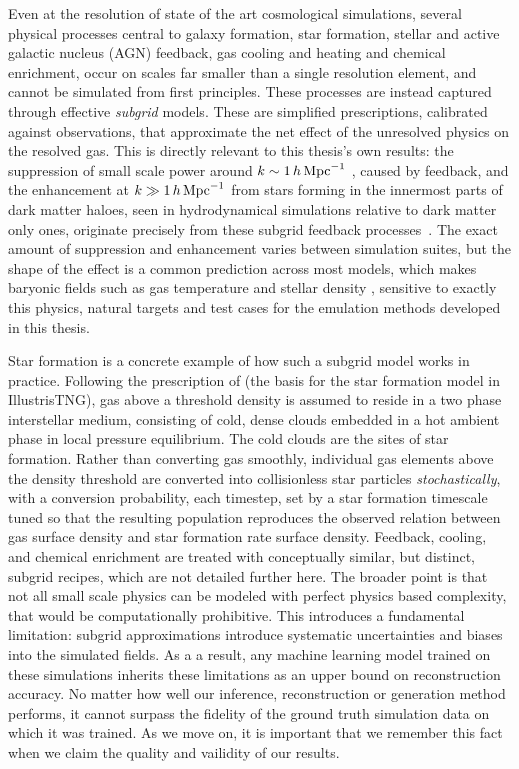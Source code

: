 \vspace{\baselineskip}

Even at the resolution of state of the art cosmological simulations, several physical processes central to galaxy formation, star formation, stellar and active galactic nucleus (AGN) feedback, gas cooling and heating and chemical enrichment, occur on scales far smaller than a single resolution element, and cannot be simulated from first principles. These processes are instead captured through effective \emph{subgrid} models. These are simplified prescriptions, calibrated against observations, that approximate the net effect of the unresolved physics on the resolved gas. This is directly relevant to this thesis's own results: the suppression of small scale power around $k\sim1\,h\,\mathrm{Mpc}^{-1}$ , caused by feedback, and the enhancement at $k\gg1\,h\,\mathrm{Mpc}^{-1}$ from stars forming in the innermost parts of dark matter haloes, seen in hydrodynamical simulations relative to dark matter only ones, originate precisely from these subgrid feedback processes~\citep{chisari19,schneider15,vandaalen20}. The exact amount of suppression and enhancement varies between simulation suites, but the shape of the effect is a common prediction across most models, which makes baryonic fields such as gas temperature and stellar density , sensitive to exactly this physics, natural targets and test cases for the emulation methods developed in this thesis.

\vspace{\baselineskip}

Star formation is a concrete example of how such a subgrid model works in practice. Following the prescription of \citet{Springel_2003} (the basis for the star formation model in IllustrisTNG), gas above a threshold density is assumed to reside in a two phase interstellar medium, consisting of cold, dense clouds embedded in a hot ambient phase in local pressure equilibrium. The cold clouds are the sites of star formation. Rather than converting gas smoothly, individual gas elements above the density threshold are converted into collisionless star particles \emph{stochastically}, with a conversion probability, each timestep, set by a star formation timescale tuned so that the resulting population reproduces the observed relation between gas surface density and star formation rate surface density. Feedback, cooling, and chemical enrichment are treated with conceptually similar, but distinct, subgrid recipes, which are not detailed further here. The broader point is that not all small scale physics can be modeled with perfect physics based complexity, that would be computationally prohibitive. This introduces a fundamental limitation: subgrid approximations introduce systematic uncertainties and biases into the simulated fields. As a a result, any machine learning model trained on these simulations inherits these limitations as an upper bound on reconstruction accuracy. No matter how well our inference, reconstruction or generation method performs, it cannot surpass the fidelity of the ground truth simulation data on which it was trained. As we move on, it is important that we remember this fact when we claim the quality and vailidity of our results.

